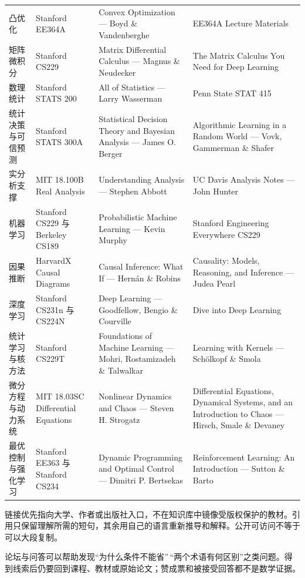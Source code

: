 {\begin{longtable}{@{}>{\raggedright\arraybackslash}p{2.2cm}>{\raggedright\arraybackslash}p{4cm}>{\raggedright\arraybackslash}p{4cm}>{\raggedright\arraybackslash}p{4cm}@{}}
凸优化 & Stanford EE364A & Convex Optimization --- Boyd \& Vandenberghe & EE364A Lecture Materials \\
矩阵微积分 & Stanford CS229 & Matrix Differential Calculus --- Magnus \& Neudecker & The Matrix Calculus You Need for Deep Learning \\
数理统计 & Stanford STATS 200 & All of Statistics --- Larry Wasserman & Penn State STAT 415 \\
统计决策与可信预测 & Stanford STATS 300A & Statistical Decision Theory and Bayesian Analysis --- James O. Berger & Algorithmic Learning in a Random World --- Vovk, Gammerman \& Shafer \\
实分析支撑 & MIT 18.100B Real Analysis & Understanding Analysis --- Stephen Abbott & UC Davis Analysis Notes --- John Hunter \\
机器学习 & Stanford CS229 与 Berkeley CS189 & Probabilistic Machine Learning --- Kevin Murphy & Stanford Engineering Everywhere CS229 \\
因果推断 & HarvardX Causal Diagrams & Causal Inference: What If --- Hern\'an \& Robins & Causality: Models, Reasoning, and Inference --- Judea Pearl \\
深度学习 & Stanford CS231n 与 CS224N & Deep Learning --- Goodfellow, Bengio \& Courville & Dive into Deep Learning \\
统计学习与核方法 & Stanford CS229T & Foundations of Machine Learning --- Mohri, Rostamizadeh \& Talwalkar & Learning with Kernels --- Schölkopf \& Smola \\
微分方程与动力系统 & MIT 18.03SC Differential Equations & Nonlinear Dynamics and Chaos --- Steven H. Strogatz & Differential Equations, Dynamical Systems, and an Introduction to Chaos --- Hirsch, Smale \& Devaney \\
最优控制与强化学习 & Stanford EE363 与 Stanford CS234 & Dynamic Programming and Optimal Control --- Dimitri P. Bertsekas & Reinforcement Learning: An Introduction --- Sutton \& Barto \\
\end{longtable}
}

链接优先指向大学、作者或出版社入口，不在知识库中镜像受版权保护的教材。引用只保留理解所需的短句，其余用自己的语言重新推导和解释。公开可访问不等于可以大段复制。

论坛与问答可以帮助发现``为什么条件不能省''\,``两个术语有何区别''之类问题。得到线索后仍要回到课程、教材或原始论文；赞成票和被接受回答都不是数学证据。
